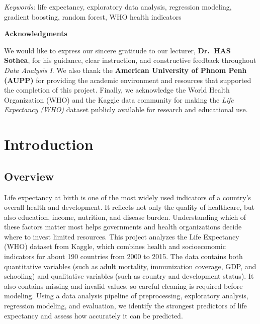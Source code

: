 \documentclass[12pt,a4paper]{article}
\begin{document}
\vspace{0.3cm}
\hspace*{0.5in}\emph{Keywords:} life expectancy, exploratory data analysis, regression modeling, gradient boosting, random forest, WHO health indicators

\clearpage
\begin{center}
  {\Large\bfseries Acknowledgments}
\end{center}
\vspace{0.3cm}
\noindent
\indent We would like to express our sincere gratitude to our lecturer, \textbf{Dr.\ HAS Sothea}, for his guidance, clear instruction, and constructive feedback throughout \emph{Data Analysis I}. We also thank the \textbf{American University of Phnom Penh (AUPP)} for providing the academic environment and resources that supported the completion of this project. Finally, we acknowledge the World Health Organization (WHO) and the Kaggle data community for making the \emph{Life Expectancy (WHO)} dataset publicly available for research and educational use.

\clearpage
{\singlespacing\tableofcontents}
\clearpage
\setlength{\headheight}{15pt}
\pagestyle{fancy}
\setcounter{page}{1}

\section{Introduction}
\subsection{Overview}
Life expectancy at birth is one of the most widely used indicators of a country's overall health and development. It reflects not only the quality of healthcare, but also education, income, nutrition, and disease burden. Understanding which of these factors matter most helps governments and health organizations decide where to invest limited resources. This project analyzes the Life Expectancy (WHO) dataset from Kaggle, which combines health and socioeconomic indicators for about 190 countries from 2000 to 2015. The data contains both quantitative variables (such as adult mortality, immunization coverage, GDP, and schooling) and qualitative variables (such as country and development status). It also contains missing and invalid values, so careful cleaning is required before modeling. Using a data analysis pipeline of preprocessing, exploratory analysis, regression modeling, and evaluation, we identify the strongest predictors of life expectancy and assess how accurately it can be predicted.
\end{document}
